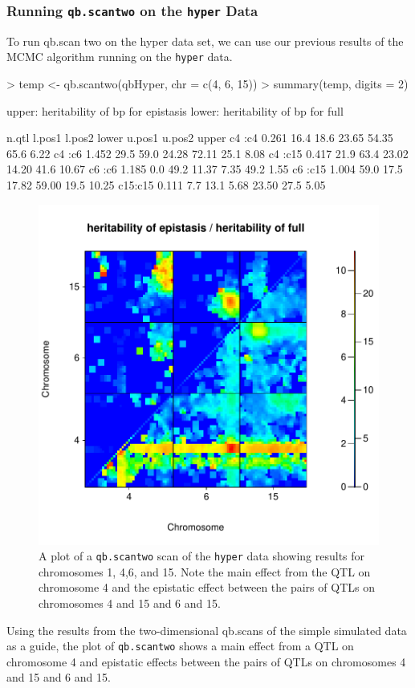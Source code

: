 \documentclass[12pt]{article}
\begin{document}
\subsubsection{Running {\tt qb.scantwo} on the {\tt hyper} Data}
To run qb.scan two on the hyper data set, we can use our previous results 
of the MCMC algorithm running on the {\tt hyper} data. 
\begin{Schunk}
\begin{Sinput}
> temp <- qb.scantwo(qbHyper, chr = c(4, 6, 15))
> summary(temp, digits = 2)
\end{Sinput}
\begin{Soutput}
upper: heritability of bp for epistasis
lower: heritability of bp for full 

        n.qtl l.pos1 l.pos2 lower u.pos1 u.pos2 upper
c4 :c4  0.261   16.4   18.6 23.65  54.35   65.6  6.22
c4 :c6  1.452   29.5   59.0 24.28  72.11   25.1  8.08
c4 :c15 0.417   21.9   63.4 23.02  14.20   41.6 10.67
c6 :c6  1.185    0.0   49.2 11.37   7.35   49.2  1.55
c6 :c15 1.004   59.0   17.5 17.82  59.00   19.5 10.25
c15:c15 0.111    7.7   13.1  5.68  23.50   27.5  5.05
\end{Soutput}
\end{Schunk}
\begin{figure}
\includegraphics{scanPDF/FIG-Scantwo-HyperData}
\caption{A plot of a {\tt qb.scantwo} scan of the {\tt hyper} data 
showing results for chromosomes 1, 4,6, and 15. Note the main effect from 
the QTL on chromosome 4 and the epistatic effect between the pairs of 
QTLs on  chromosomes 4 and 15 and 6 and 15.}
\end{figure}
Using the results from the two-dimensional qb.scans of the simple 
simulated data as a guide, the plot of {\tt qb.scantwo} shows a 
main effect from a QTL on chromosome 4 and epistatic
effects between the pairs of QTLs on chromosomes 4 and 15 and 6 and 15. 
\end{document}
